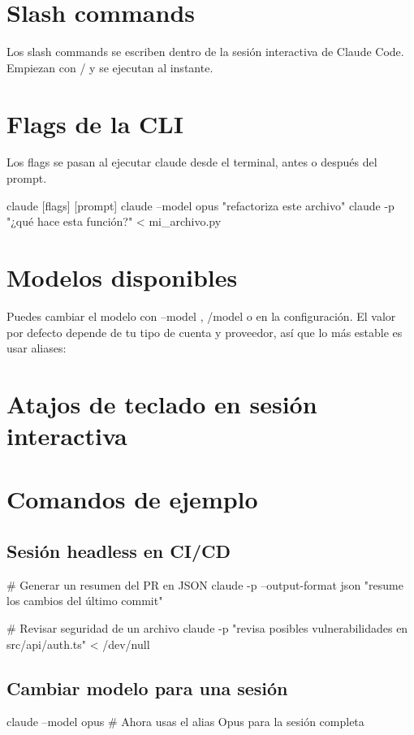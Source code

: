 \documentclass[11pt,a4paper]{book}
\begin{document}
\section{Slash commands}
Los slash commands se escriben dentro de la sesión interactiva de Claude Code. Empiezan con / y se ejecutan al instante.

\section{Flags de la CLI}
Los flags se pasan al ejecutar claude desde el terminal, antes o después del prompt.

\begin{codebox}
claude [flags] [prompt]
claude --model opus "refactoriza este archivo"
claude -p "¿qué hace esta función?" < mi_archivo.py
\end{codebox}
\section{Modelos disponibles}
Puedes cambiar el modelo con --model , /model o en la configuración. El valor por defecto depende de tu tipo de cuenta y proveedor, así que lo más estable es usar aliases:

\section{Atajos de teclado en sesión interactiva}
\section{Comandos de ejemplo}
\subsection{Sesión headless en CI/CD}
\begin{codebox}
# Generar un resumen del PR en JSON
claude -p --output-format json "resume los cambios del último commit"

# Revisar seguridad de un archivo
claude -p "revisa posibles vulnerabilidades en src/api/auth.ts" < /dev/null
\end{codebox}
\subsection{Cambiar modelo para una sesión}
\begin{codebox}
claude --model opus
# Ahora usas el alias Opus para la sesión completa
\end{codebox}
\end{document}
